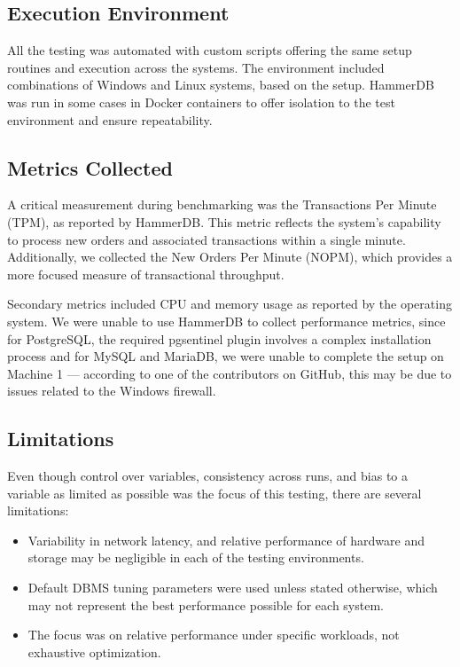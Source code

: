 \subsection{Execution Environment}

All the testing was automated with custom scripts offering the same setup routines and execution across the systems. The environment included combinations of Windows and Linux systems, based on the setup. HammerDB was run in some cases in Docker containers to offer isolation to the test environment and ensure repeatability.

\subsection{Metrics Collected}

A critical measurement during benchmarking was the Transactions Per Minute (TPM), as reported by HammerDB. This metric reflects the system's capability to process new orders and associated transactions within a single minute. Additionally, we collected the New Orders Per Minute (NOPM), which provides a more focused measure of transactional throughput.

Secondary metrics included CPU and memory usage as reported by the operating system. We were unable to use HammerDB to collect performance metrics, since for PostgreSQL, the required pgsentinel plugin involves a complex installation process and for MySQL and MariaDB, we were unable to complete the setup on Machine 1 — according to one of the contributors on GitHub, this may be due to issues related to the Windows firewall.

\subsection{Limitations}

Even though control over variables, consistency across runs, and bias to a variable as limited as possible was the focus of this testing, there are several limitations:

\begin{itemize}
    \setlength\itemsep{0.1em}
    \item Variability in network latency, and relative performance of hardware and storage may be negligible in each of the testing environments.
    \item Default DBMS tuning parameters were used unless stated otherwise, which may not represent the best performance possible for each system.
    \item The focus was on relative performance under specific workloads, not exhaustive optimization.
\end{itemize}

